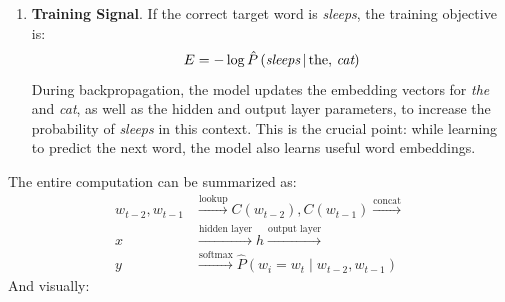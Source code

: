 \begin{examplebox}
\begin{enumerate}
        \item \textbf{Training Signal}. If the correct target word is \emph{sleeps}, the training objective is:
        \begin{equation*}
            E = -\log \hat{P}\left(\emph{sleeps} \, | \, \text{the}, \, \emph{cat} \right)
        \end{equation*}
        During backpropagation, the model updates the embedding vectors for \emph{the} and \emph{cat}, as well as the hidden and output layer parameters, to increase the probability of \emph{sleeps} in this context. This is the crucial point: while learning to predict the next word, the model also learns useful word embeddings.
    \end{enumerate}
    The entire computation can be summarized as:
    \begin{align*}
        w_{t-2},w_{t-1} &\xrightarrow{\text{lookup}} C\left(w_{t-2}\right), C\left(w_{t-1}\right) \xrightarrow{\text{concat}} \\
        x &\xrightarrow{\text{hidden layer}} h \xrightarrow{\text{output layer}} \\
        y &\xrightarrow{\text{softmax}} \hat{P}\left(w_i = w_t \mid w_{t-2}, w_{t-1}\right)
    \end{align*}
    And visually:
    \begin{center}
        \tikzwidth{\textwidth}
        \begin{tikzpicture}[
                layer/.style={
                    draw,
                    minimum height=0.95cm,
                    align=center
                },
                neuron/.style={
                    circle,
                    draw,
                    minimum size=0.23cm,
                    inner sep=0pt
                },
                arrow/.style={
                    ->,
                    thick
                },
                tag/.style={
                    draw,
                    rounded corners=2pt,
                    fill=white,
                    font=\scriptsize,
                    inner xsep=4pt,
                    inner ysep=2pt
                },
                smalltext/.style={
                    font=\scriptsize,
                    fill=white,
                    inner sep=2.2pt
                }
            ]



\end{tikzpicture}
\end{center}
\end{examplebox}
